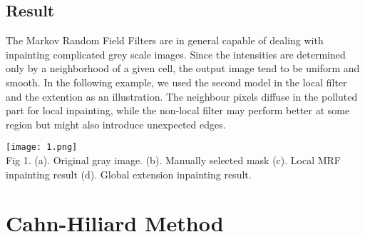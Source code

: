 \documentclass[a4paper]{article}
\begin{document}
\begin{spacing}{1.4}
\subsection{Result}
The Markov Random Field Filters are in general capable of dealing with inpainting complicated grey scale images. Since the intensities are determined only by a neighborhood of a given cell, the output image tend to be uniform and smooth. In the following example, we used the second model in the local filter and the extention as an illustration. The neighbour pixels diffuse in the polluted part for local inpainting, while the non-local filter may perform better at some region but might also introduce unexpected edges. 
\begin{center}
\texttt{[image: 1.png]}\\
\scriptsize
Fig 1. (a). Original gray image. (b). Manually selected mask (c). Local MRF inpainting result (d). Global extension inpainting result.
\end{center}
\normalsize
\section{Cahn-Hiliard Method}

\end{spacing}
\end{document}
